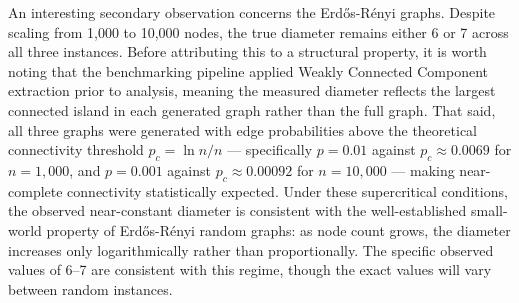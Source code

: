 An interesting secondary observation concerns the Erdős-Rényi graphs. Despite scaling from 1,000 to 10,000 nodes, the true diameter remains either 6 or 7 across all three instances. Before attributing this to a structural property, it is worth noting that the benchmarking pipeline applied Weakly Connected Component extraction prior to analysis, meaning the measured diameter reflects the largest connected island in each generated graph rather than the full graph. That said, all three graphs were generated with edge probabilities above the theoretical connectivity threshold $p_c = \ln n / n$ --- specifically $p = 0.01$ against $p_c \approx 0.0069$ for $n = 1{,}000$, and $p = 0.001$ against $p_c \approx 0.00092$ for $n = 10{,}000$ --- making near-complete connectivity statistically expected. Under these supercritical conditions, the observed near-constant diameter is consistent with the well-established small-world property of Erdős-Rényi random graphs: as node count grows, the diameter increases only logarithmically rather than proportionally. The specific observed values of 6--7 are consistent with this regime, though the exact values will vary between random instances.

